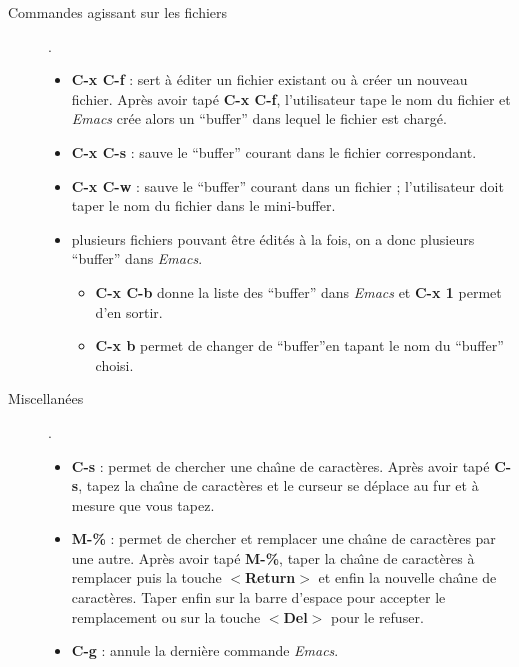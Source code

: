 \begin{description}
\item[Commandes agissant sur les fichiers] .

\begin{itemize}
\item {\bf C-x C-f} : sert \`a  \'editer un fichier existant ou \`a cr\'eer
un nouveau fichier. 
Apr\`es avoir tap\'e {\bf C-x C-f}, l'utilisateur tape le nom du fichier et 
{\em Emacs} cr\'ee alors un ``buffer'' dans lequel le fichier est charg\'e.
\item {\bf C-x C-s} : sauve le ``buffer'' courant dans le fichier 
correspondant. 
\item {\bf C-x C-w} : sauve le ``buffer'' courant dans un fichier ; 
l'utilisateur doit taper le nom du fichier dans le mini-buffer.
\item plusieurs fichiers pouvant \^etre \'edit\'es \`a la fois, on a donc 
 plusieurs ``buffer'' dans {\em Emacs}. 
\begin{itemize}
\item {\bf C-x C-b} donne la liste des ``buffer'' dans {\em Emacs}
et {\bf C-x 1} permet d'en sortir.
\item 
{\bf C-x b} permet de changer de ``buffer''en tapant le nom du
``buffer'' choisi.
\end{itemize}
\end{itemize}

\newpage

\item[Miscellan\'ees] .

\begin{itemize}
\item {\bf  C-s} : permet de chercher une cha\^{\i}ne de caract\`eres. 
Apr\`es avoir tap\'e {\bf C-s}, tapez la cha\^{\i}ne de caract\`eres
 et le curseur 
se d\'eplace au fur et \`a mesure que vous tapez.
\item {\bf  M-\%} : permet de chercher et remplacer  une cha\^{\i}ne
 de caract\`eres par une autre. 
Apr\`es avoir tap\'e {\bf M-\%}, taper la cha\^{\i}ne de caract\`eres
\`a remplacer
puis la touche $<${\bf Return}$>$ et enfin la nouvelle
 cha\^{\i}ne de caract\`eres. Taper enfin sur la barre d'espace pour 
accepter le remplacement ou sur la touche $<${\bf Del}$>$ pour le refuser.
\item {\bf  C-g} : annule la derni\`ere commande {\em Emacs}.
\end{itemize}

\end{description}

\newpage

